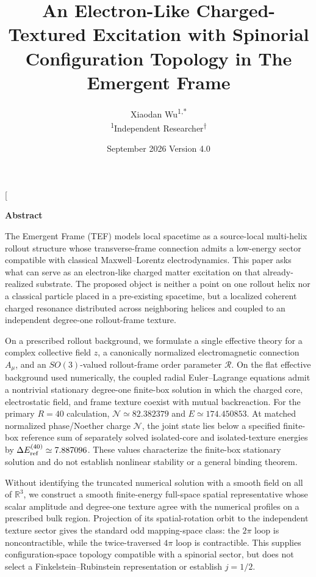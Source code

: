 \documentclass[11pt]{article}
\title{\bfseries An Electron-Like Charged-Textured Excitation with Spinorial Configuration Topology in The Emergent Frame}
\author{\small Xiaodan Wu\textsuperscript{1,*}\\[-0.10em]
\footnotesize \textsuperscript{1}Independent Researcher\textsuperscript{\(\dagger\)}}
\date{\footnotesize September 2026 \quad Version 4.0}
\begin{document}
\twocolumn[
\begin{@twocolumnfalse}
\maketitle
\vspace{-0.85em}
\begingroup
\normalsize
{}
\begin{center}
\textbf{Abstract}
\end{center}
\noindent
The Emergent Frame (TEF) models local spacetime as a source-local multi-helix rollout structure whose transverse-frame connection admits a low-energy sector compatible with classical Maxwell--Lorentz electrodynamics. This paper asks what can serve as an electron-like charged matter excitation on that already-realized substrate. The proposed object is neither a point on one rollout helix nor a classical particle placed in a pre-existing spacetime, but a localized coherent charged resonance distributed across neighboring helices and coupled to an independent degree-one rollout-frame texture.

On a prescribed rollout background, we formulate a single effective theory for a complex collective field \(z\), a canonically normalized electromagnetic connection \(A_\mu\), and an \(SO(3)\)-valued rollout-frame order parameter \(\mathcal R\). On the flat effective background used numerically, the coupled radial Euler--Lagrange equations admit a nontrivial stationary degree-one finite-box solution in which the charged core, electrostatic field, and frame texture coexist with mutual backreaction. For the primary \(R=40\) calculation, \(\mathcal N\simeq82.382379\) and \(E\simeq174.450853\). At matched normalized phase/Noether charge \(\mathcal N\), the joint state lies below a specified finite-box reference sum of separately solved isolated-core and isolated-texture energies by \(\Delta E_{\rm ref}^{(40)}\simeq7.887096\). These values characterize the finite-box stationary solution and do not establish nonlinear stability or a general binding theorem.

Without identifying the truncated numerical solution with a smooth field on all of \(\mathbb R^3\), we construct a smooth finite-energy full-space spatial representative whose scalar amplitude and degree-one texture agree with the numerical profiles on a prescribed bulk region. Projection of its spatial-rotation orbit to the independent texture sector gives the standard odd mapping-space class: the \(2\pi\) loop is noncontractible, while the twice-traversed \(4\pi\) loop is contractible. This supplies configuration-space topology compatible with a spinorial sector, but does not select a Finkelstein--Rubinstein representation or establish \(j=1/2\).


\end{@twocolumnfalse}
\end{document}
